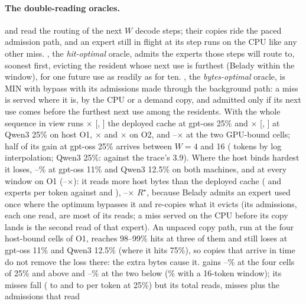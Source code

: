 \paragraph{The double-reading oracles.}  and \MinTwo{} read the routing of the next $W$ decode steps; their copies ride the
paced admission path, and an expert still in flight at its step runs on the CPU like any other miss. ,
the \emph{hit-optimal} oracle, admits the experts those steps will route to, soonest first, evicting the resident whose
next use is furthest (Belady within the window), for one future use as readily as for ten. \MinTwo, the \emph{bytes-optimal}
oracle, is MIN with bypass with its admissions made through the background path: a miss is served where it is, by the
CPU or a demand copy, and admitted only if its next use comes before the furthest next use among the residents. With
the whole sequence in view  runs \fsmRatioGMid$\times$ [\fsmRatioLoGMid, \fsmRatioHiGMid] the
deployed cache at gpt-oss 25\% and \fsmRatioQMid$\times$ [\fsmRatioLoQMid, \fsmRatioHiQMid] at Qwen3 25\% on host O1,
\fspRatioGMid$\times$ and \fspRatioQMid$\times$ on O2, and \fsHitGpuMin--\fsHitGpuMax$\times$ at the two GPU-bound
cells; half of its gain at gpt-oss 25\% arrives between $W{=}4$ and 16 (\fsmWfiftyGMid{} tokens by log
interpolation; Qwen3 25\%: \fsmWfiftyQMid{} against the trace's 3.9). Where the host binds hardest it loses,
\fsHitLossMin--\fsHitLossMax\% at gpt-oss 11\% and Qwen3 12.5\% on both machines, and at every window on O1
(\fsmNegWinMin--\fsmNegWinMax$\times$): it reads more host bytes than the deployed cache (\fsmReadsOracleGLow{} and
\fsmReadsOracleQLow{} experts per token against \fsmReadsBaseGLow{} and \fsmReadsBaseQLow),
\fsmTotalReadsOptMin--\fsmTotalReadsOptMax$\times$ $R^\star$, because Belady admits an expert used once
where the optimum bypasses it and re-copies what it evicts (its admissions, each one read, are most of its reads; a
miss served on the CPU before its copy lands is the second read of that expert). An unpaced copy path, run at the
four host-bound cells of O1, reaches 98--99\% hits at three of them and still loses at gpt-oss 11\% and Qwen3 12.5\%
(where it hits 75\%), so copies that arrive in time do not remove the loss there: the extra bytes cause it. \MinTwo{} gains
\fsbGainHighMin--\fsbGainHighMax\% at the four cells of 25\% and above and \fsbGainLowMin--\fsbGainLowMax\% at the two
below (\fsbGainLowMaxAny\% with a 16-token window); its misses fall (\fsbMissesBaseGMid{} to \fsbMissesGMid{} and
\fsbMissesBaseQMid{} to \fsbMissesQMid{} per token at 25\%) but its total reads, misses plus the admissions that read
